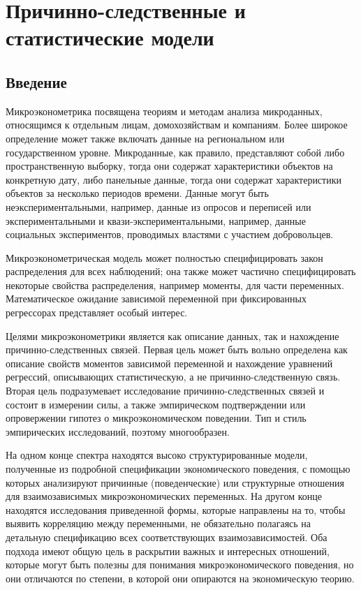 
\chapter{Причинно-следственные и статистические модели}

\section{Введение}

	Микроэконометрика посвящена теориям и методам анализа микроданных, относящимся к отдельным лицам, домохозяйствам и компаниям. Более широкое определение может также включать данные на региональном или государственном уровне. Микроданные, как правило, представляют собой либо пространственную выборку, тогда они содержат характеристики объектов на  конкретную дату, либо панельные данные, тогда они содержат характеристики объектов за несколько периодов времени. Данные могут быть неэкспериментальными, например, данные из опросов и переписей или экспериментальными и квази-экспериментальными, например, данные социальных  экспериментов, проводимых властями с участием добровольцев. 
	
	
	Микроэконометрическая модель может полностью  специфицировать закон распределения для всех наблюдений; она также может частично специфицировать некоторые свойства распределения, например моменты, для части переменных. Математическое ожидание зависимой переменной при фиксированных регрессорах представляет особый интерес. 
	
	
	Целями микроэконометрики является как описание данных, так и нахождение причинно-следственных связей. 
	Первая цель может быть вольно определена как описание свойств моментов зависимой переменной и нахождение уравнений регрессий, описывающих статистическую, а не причинно-следственную связь. Вторая цель подразумевает исследование причинно-следственных связей и состоит в измерении силы, а также эмпирическом подтверждении или опровержении гипотез о микроэкономическом поведении. Тип и стиль эмпирических исследований, поэтому многообразен. 
	
	На одном конце спектра находятся высоко структурированные модели, полученные из подробной спецификации экономического поведения, с помощью которых анализируют причинные (поведенческие) или структурные отношения для взаимозависимых микроэкономических переменных. На другом конце находятся исследования приведенной формы, которые направлены на то, чтобы выявить корреляцию между переменными, не обязательно полагаясь на детальную спецификацию всех соответствующих взаимозависимостей. Оба подхода имеют общую цель в раскрытии важных и интересных отношений, которые могут быть полезны для понимания микроэкономического поведения, но они отличаются по степени, в которой они опираются на экономическую теорию. 
	

